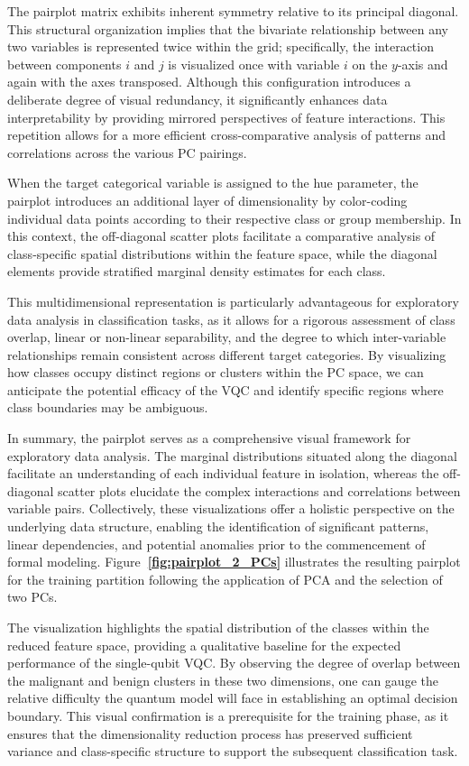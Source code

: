 \documentclass[en]{dimscthesis}
\begin{document}
The pairplot matrix exhibits inherent symmetry relative to its principal diagonal. This structural organization implies that the bivariate relationship between any two variables is represented twice within the grid; specifically, the interaction between components $i$ and $j$ is visualized once with variable $i$ on the $y$-axis and again with the axes transposed. Although this configuration introduces a deliberate degree of visual redundancy, it significantly enhances data interpretability by providing mirrored perspectives of feature interactions. This repetition allows for a more efficient cross-comparative analysis of patterns and correlations across the various PC pairings.

When the target categorical variable is assigned to the hue parameter, the pairplot introduces an additional layer of dimensionality by color-coding individual data points according to their respective class or group membership. In this context, the off-diagonal scatter plots facilitate a comparative analysis of class-specific spatial distributions within the feature space, while the diagonal elements provide stratified marginal density estimates for each class.

This multidimensional representation is particularly advantageous for exploratory data analysis in classification tasks, as it allows for a rigorous assessment of class overlap, linear or non-linear separability, and the degree to which inter-variable relationships remain consistent across different target categories. By visualizing how classes occupy distinct regions or clusters within the PC space, we can anticipate the potential efficacy of the VQC and identify specific regions where class boundaries may be ambiguous.

In summary, the pairplot serves as a comprehensive visual framework for exploratory data analysis. The marginal distributions situated along the diagonal facilitate an understanding of each individual feature in isolation, whereas the off-diagonal scatter plots elucidate the complex interactions and correlations between variable pairs. Collectively, these visualizations offer a holistic perspective on the underlying data structure, enabling the identification of significant patterns, linear dependencies, and potential anomalies prior to the commencement of formal modeling. Figure\textbf{~\ref{fig:pairplot_2_PCs}} illustrates the resulting pairplot for the training partition following the application of PCA and the selection of two PCs.

The visualization highlights the spatial distribution of the classes within the reduced feature space, providing a qualitative baseline for the expected performance of the single-qubit VQC. By observing the degree of overlap between the malignant and benign clusters in these two dimensions, one can gauge the relative difficulty the quantum model will face in establishing an optimal decision boundary. This visual confirmation is a prerequisite for the training phase, as it ensures that the dimensionality reduction process has preserved sufficient variance and class-specific structure to support the subsequent classification task. 
\end{document}
